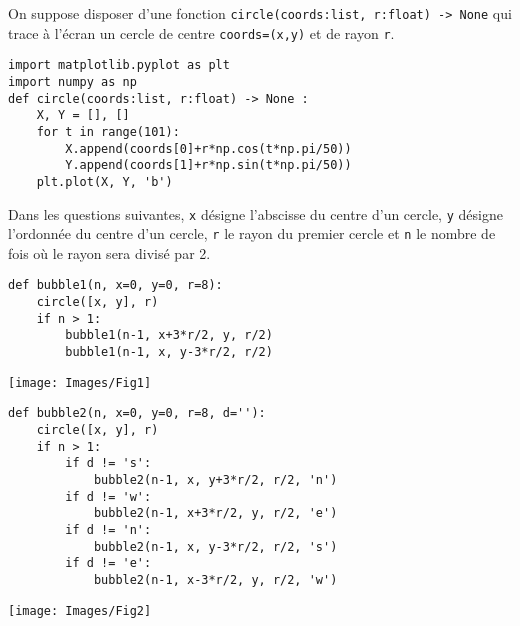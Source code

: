 
 On suppose disposer d’une fonction \texttt{circle(coords:list, r:float) -> None} qui trace à l’écran un cercle de centre 
 \texttt{coords=(x,y)} et de rayon \texttt{r}.
\ifprof\else
\begin{lstlisting}
import matplotlib.pyplot as plt
import numpy as np
def circle(coords:list, r:float) -> None :
    X, Y = [], []
    for t in range(101):
        X.append(coords[0]+r*np.cos(t*np.pi/50))
        Y.append(coords[1]+r*np.sin(t*np.pi/50))
    plt.plot(X, Y, 'b')
\end{lstlisting}
\fi


Dans les questions suivantes, \texttt{x} désigne l'abscisse du centre d'un cercle, \texttt{y} désigne l'ordonnée du centre d'un cercle, \texttt{r} le rayon du premier cercle et \texttt{n} le nombre de fois où le rayon sera divisé par 2. 
 
\ifprof
\begin{lstlisting}
def bubble1(n, x=0, y=0, r=8):
    circle([x, y], r)
    if n > 1:
        bubble1(n-1, x+3*r/2, y, r/2)
        bubble1(n-1, x, y-3*r/2, r/2)
\end{lstlisting}
\else
\begin{center}
\texttt{[image: Images/Fig1]}
\end{center}
\fi

\ifprof
\begin{lstlisting}
def bubble2(n, x=0, y=0, r=8, d=''):
    circle([x, y], r)
    if n > 1:
        if d != 's':
            bubble2(n-1, x, y+3*r/2, r/2, 'n')
        if d != 'w':
            bubble2(n-1, x+3*r/2, y, r/2, 'e')
        if d != 'n':
            bubble2(n-1, x, y-3*r/2, r/2, 's')
        if d != 'e':
            bubble2(n-1, x-3*r/2, y, r/2, 'w')
\end{lstlisting}
\else
\begin{center}
\texttt{[image: Images/Fig2]}
\end{center}
\fi
